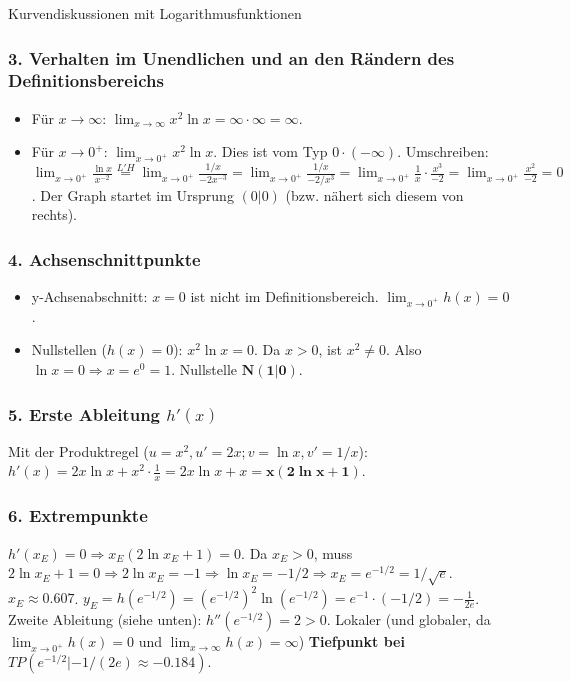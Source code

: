 \begin{loesungsumgebung}{Kurvendiskussionen mit Logarithmusfunktionen}
\begin{enumerate}[label=(\alph*)]
    \subsubsection*{3. Verhalten im Unendlichen und an den Rändern des Definitionsbereichs}
    \begin{itemize}
        \item Für $x \to \infty$: $\lim_{x \to \infty} x^2 \ln x = \infty \cdot \infty = \infty$.
        \item Für $x \to 0^+$: $\lim_{x \to 0^+} x^2 \ln x$. Dies ist vom Typ $0 \cdot (-\infty)$.
        Umschreiben: $\lim_{x \to 0^+} \frac{\ln x}{x^{-2}} \stackrel{L'H}{=} \lim_{x \to 0^+} \frac{1/x}{-2x^{-3}} = \lim_{x \to 0^+} \frac{1/x}{-2/x^3} = \lim_{x \to 0^+} \frac{1}{x} \cdot \frac{x^3}{-2} = \lim_{x \to 0^+} \frac{x^2}{-2} = 0$.
        Der Graph startet im Ursprung $(0|0)$ (bzw. nähert sich diesem von rechts).
    \end{itemize}

    \subsubsection*{4. Achsenschnittpunkte}
    \begin{itemize}
        \item y-Achsenabschnitt: $x=0$ ist nicht im Definitionsbereich. $\lim_{x \to 0^+} h(x) = 0$.
        \item Nullstellen ($h(x)=0$): $x^2 \ln x = 0$. Da $x>0$, ist $x^2 \neq 0$.
        Also $\ln x = 0 \Rightarrow x = e^0 = 1$.
        Nullstelle $\mathbf{N(1|0)}$.
    \end{itemize}

    \subsubsection*{5. Erste Ableitung $h'(x)$}
    Mit der Produktregel ($u=x^2, u'=2x; v=\ln x, v'=1/x$):
    $h'(x) = 2x \ln x + x^2 \cdot \frac{1}{x} = 2x \ln x + x = \mathbf{x(2\ln x + 1)}$.

    \subsubsection*{6. Extrempunkte}
    $h'(x_E)=0 \Rightarrow x_E(2\ln x_E + 1) = 0$.
    Da $x_E>0$, muss $2\ln x_E + 1 = 0 \Rightarrow 2\ln x_E = -1 \Rightarrow \ln x_E = -1/2 \Rightarrow x_E = e^{-1/2} = 1/\sqrt{e}$.
    $x_E \approx 0.607$.
    $y_E = h(e^{-1/2}) = (e^{-1/2})^2 \ln(e^{-1/2}) = e^{-1} \cdot (-1/2) = -\frac{1}{2e}$.
    Zweite Ableitung (siehe unten): $h''(e^{-1/2}) = 2 > 0$.
    Lokaler (und globaler, da $\lim_{x\to 0^+} h(x)=0$ und $\lim_{x\to\infty} h(x)=\infty$) \textbf{Tiefpunkt bei $TP(e^{-1/2} | -1/(2e) \approx -0.184)$}.


\end{enumerate}
\end{loesungsumgebung}
